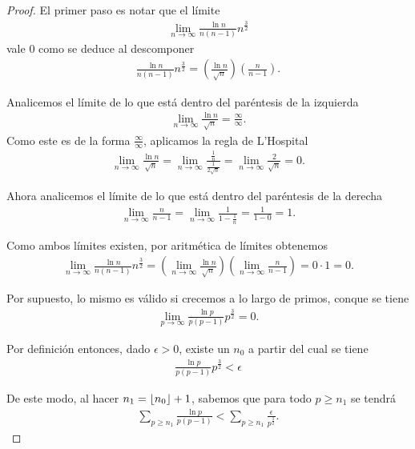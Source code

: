 \documentclass[10pt]{article}
\DeclarePairedDelimiter\floor{\lfloor}{\rfloor}
\theoremstyle{definition}
\theoremstyle{remark}
\begin{document}
\begin{proof}
El primer paso es notar que el l\'imite
\begin{align}
\lim_{n \to \infty} \frac{\ln n}{n (n - 1)} n^\frac{3}{2}
\end{align}
vale $0$ como se deduce al descomponer 
\begin{align}
\frac{\ln n}{n (n - 1)} n^\frac{3}{2} = \left(\frac{\ln n}{\sqrt{n}}\right)\left(\frac{n}{n - 1}\right).
\end{align}

Analicemos el l\'imite de lo que est\'a dentro del par\'entesis de la izquierda
\begin{align}
\lim_{n \to \infty} \frac{\ln n}{\sqrt{n}} = \frac{\infty}{\infty}.
\end{align}
Como este es de la forma $\frac{\infty}{\infty}$, aplicamos la regla de L'Hospital
\begin{align}
\lim_{n \to \infty} \frac{\ln n}{\sqrt{n}}
= \lim_{n \to \infty}\frac{\frac{1}{n}}{\frac{1}{2\sqrt{n}}}
= \lim_{n \to \infty} \frac{2}{\sqrt{n}} = 0.
\end{align}

Ahora analicemos el l\'imite de lo que est\'a dentro del par\'entesis de la derecha
\begin{align}
\lim_{n \to \infty} \frac{n}{n - 1}
= \lim_{n \to \infty} \frac{1}{1 - \frac{1}{n}}
= \frac{1}{1 - 0} = 1.
\end{align}

Como ambos l\'imites existen, por aritm\'etica de l\'imites obtenemos
\begin{align}
\lim_{n \to \infty} \frac{\ln n}{n (n - 1)} n^\frac{3}{2}
= \left(\lim_{n \to \infty} \frac{\ln n}{\sqrt{n}}\right)\left(\lim_{n \to \infty} \frac{n}{n - 1}\right)
= 0 \cdot 1 = 0.
\end{align}

Por supuesto, lo mismo es v\'alido si crecemos a lo largo de primos, conque se tiene 
\begin{align}
\lim_{p \to \infty} \frac{\ln p}{p (p - 1)} p^\frac{3}{2}=0.
\end{align}

Por definici\'on entonces, dado $\epsilon > 0$, existe un $n_0$ 
a partir del cual se tiene 
\begin{align}
\frac{\ln p}{p (p - 1)} p^\frac{3}{2} < \epsilon
\end{align}

De este modo, al hacer $n_1 = \floor{n_0} + 1$, sabemos que para todo $p \geq n_1$ se tendr\'a 
\begin{align}
\sum_{p \geq n_1} \frac{\ln p}{p (p - 1)} <  \sum_{p \geq n_1} \frac{\epsilon}{p^\frac{3}{2}}. 
\end{align}


\end{proof}
\end{document}
